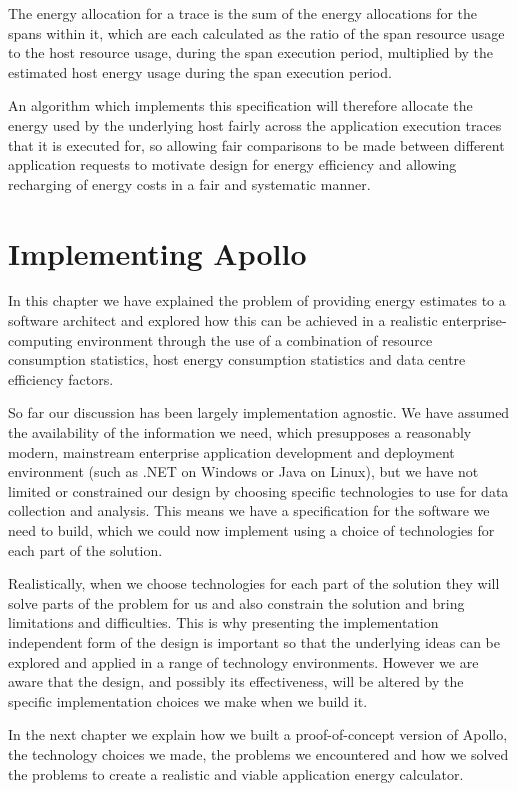 The energy allocation for a trace is the sum of the energy allocations for the spans within it, which are each calculated as the ratio of the span resource usage to the host resource usage, during the span execution period, multiplied by the estimated host energy usage during the span execution period.

An algorithm which implements this specification will therefore allocate the energy used by the underlying host fairly across the application execution traces that it is executed for, so allowing fair comparisons to be made between different application requests to motivate design for energy efficiency and allowing recharging of energy costs in a fair and systematic manner.

\section{Implementing Apollo}

In this chapter we have explained the problem of providing energy estimates to a software architect and explored how this can be achieved in a realistic enterprise-computing environment through the use of a combination of resource consumption statistics, host energy consumption statistics and data centre efficiency factors.

So far our discussion has been largely implementation agnostic.  We have assumed the availability of the information we need, which presupposes a reasonably modern, mainstream enterprise application development and deployment environment (such as .NET on Windows or Java on Linux), but we have not limited or constrained our design by choosing specific technologies to use for data collection and analysis.  This means we have a specification for the software we need to build, which we could now implement using a choice of technologies for each part of the solution.

Realistically, when we choose technologies for each part of the solution they will solve parts of the problem for us and also constrain the solution and bring limitations and difficulties.  This is why presenting the implementation independent form of the design is important so that the underlying ideas can be explored and applied in a range of technology environments.  However we are aware that the design, and possibly its effectiveness, will be altered by the specific implementation choices we make when we build it.

In the next chapter we explain how we built a proof-of-concept version of Apollo, the technology choices we made, the problems we encountered and how we solved the problems to create a realistic and viable application energy calculator.

















